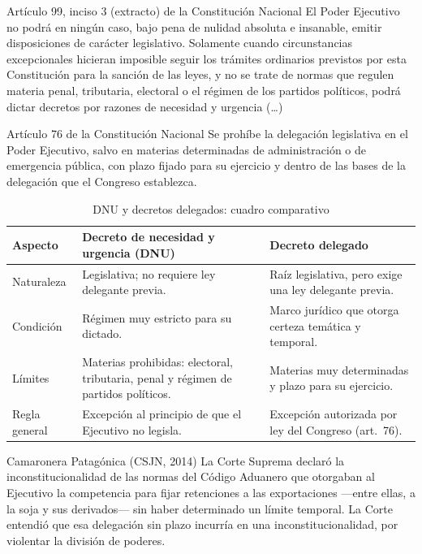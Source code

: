 \documentclass[12pt,oneside]{book}
\begin{document}
\begin{norma}{Artículo 99, inciso 3 (extracto) de la Constitución Nacional}
El Poder Ejecutivo no podrá en ningún caso, bajo pena de nulidad absoluta e insanable, emitir disposiciones de carácter legislativo. Solamente cuando circunstancias excepcionales hicieran imposible seguir los trámites ordinarios previstos por esta Constitución para la sanción de las leyes, y no se trate de normas que regulen materia penal, tributaria, electoral o el régimen de los partidos políticos, podrá dictar decretos por razones de necesidad y urgencia (\ldots)
\end{norma}

\begin{norma}{Artículo 76 de la Constitución Nacional}
Se prohíbe la delegación legislativa en el Poder Ejecutivo, salvo en materias determinadas de administración o de emergencia pública, con plazo fijado para su ejercicio y dentro de las bases de la delegación que el Congreso establezca.
\end{norma}

\begin{table}[H]
\centering
\caption{DNU y decretos delegados: cuadro comparativo}
\begin{tabularx}{\textwidth}{Q{0.22\textwidth}YY}
\toprule
\textbf{Aspecto} & \textbf{Decreto de necesidad y urgencia (DNU)} & \textbf{Decreto delegado} \\
\midrule
Naturaleza & Legislativa; no requiere ley delegante previa. & Raíz legislativa, pero exige una ley delegante previa. \\
Condición & Régimen muy estricto para su dictado. & Marco jurídico que otorga certeza temática y temporal. \\
Límites & Materias prohibidas: electoral, tributaria, penal y régimen de partidos políticos. & Materias muy determinadas y plazo para su ejercicio. \\
Regla general & Excepción al principio de que el Ejecutivo no legisla. & Excepción autorizada por ley del Congreso (art.\ 76). \\
\bottomrule
\end{tabularx}
\end{table}

\begin{example}{Camaronera Patagónica (CSJN, 2014)}
La Corte Suprema declaró la inconstitucionalidad de las normas del Código Aduanero que otorgaban al Ejecutivo la competencia para fijar retenciones a las exportaciones ---entre ellas, a la soja y sus derivados--- sin haber determinado un límite temporal. La Corte entendió que esa delegación sin plazo incurría en una inconstitucionalidad, por violentar la división de poderes.
\end{example}
\end{document}
